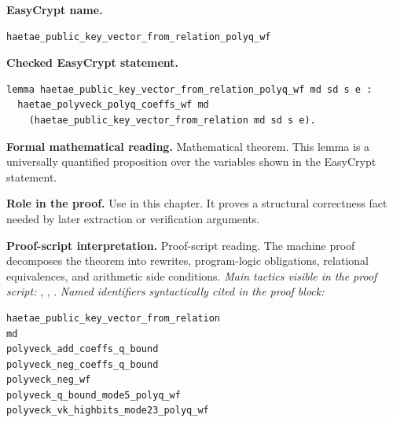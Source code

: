 \begin{formaltheorem}
\noindent\textbf{EasyCrypt name.}
\begin{lstlisting}[language=EasyCrypt,basicstyle=\ttfamily\scriptsize]
haetae_public_key_vector_from_relation_polyq_wf
\end{lstlisting}
\noindent\textbf{Checked EasyCrypt statement.}
\begin{lstlisting}[language=EasyCrypt,basicstyle=\ttfamily\scriptsize]
lemma haetae_public_key_vector_from_relation_polyq_wf md sd s e :
  haetae_polyveck_polyq_coeffs_wf md
    (haetae_public_key_vector_from_relation md sd s e).
\end{lstlisting}
\noindent\textbf{Formal mathematical reading.}
Mathematical theorem. This lemma is a universally quantified proposition over the variables shown in the EasyCrypt statement.

\noindent\textbf{Role in the proof.}
Use in this chapter. It proves a structural correctness fact needed by later extraction or verification arguments.

\noindent\textbf{Proof-script interpretation.}
Proof-script reading. The machine proof decomposes the theorem into rewrites, program-logic obligations, relational equivalences, and arithmetic side conditions.
\emph{Main tactics visible in the proof script:} , , .
\emph{Named identifiers syntactically cited in the proof block:}
\begin{lstlisting}[language=EasyCrypt,basicstyle=\ttfamily\scriptsize]
haetae_public_key_vector_from_relation
md
polyveck_add_coeffs_q_bound
polyveck_neg_coeffs_q_bound
polyveck_neg_wf
polyveck_q_bound_mode5_polyq_wf
polyveck_vk_highbits_mode23_polyq_wf
\end{lstlisting}

\end{formaltheorem}

